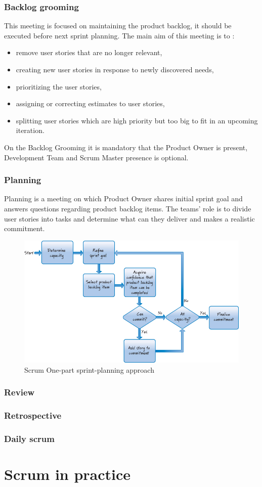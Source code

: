 \subsubsection{Backlog grooming}
This meeting is focused on maintaining the product backlog, it should be executed before next sprint planning. The main aim of this meeting is to \cite{ScrumBook2}:

\begin{itemize}
    \item remove user stories that are no longer relevant,
    \item creating new user stories in response to newly discovered needs,
    \item prioritizing the user stories, 
    \item assigning or correcting estimates to user stories,
    \item splitting user stories which are high priority but too big to fit in an upcoming iteration.
\end{itemize} 

On the Backlog Grooming it is mandatory that the Product Owner is present, Development Team and Scrum Master presence is optional.

\subsubsection{Planning}
Planning is a meeting on which Product Owner shares initial sprint goal and answers questions regarding product backlog items. The teams' role is to divide user stories into tasks and determine what can they deliver and makes a realistic commitment. 

\begin{figure}[h]
\caption{Scrum One-part sprint-planning approach \cite{ScrumBook}}
\label{fig:planningDiagram}
\centering
\includegraphics[width=1\textwidth]{img/sprintPlanning}
\end{figure}

\subsubsection{Review}

\subsubsection{Retrospective}

\subsubsection{Daily scrum}

\section{Scrum in practice}